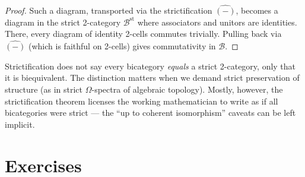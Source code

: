 \begin{proof}
Such a diagram, transported via the strictification $\widehat{(-)}$, becomes
a diagram in the strict 2-category $\mathcal{B}^{\mathrm{st}}$ where
associators and unitors are identities. There, every diagram of identity
2-cells commutes trivially. Pulling back via $\widehat{(-)}$ (which is faithful
on 2-cells) gives commutativity in $\mathcal{B}$.
\end{proof}

\begin{remark}
Strictification does not say every bicategory \emph{equals} a strict
2-category, only that it is biequivalent. The distinction matters when we
demand strict preservation of structure (as in strict $\Omega$-spectra of
algebraic topology). Mostly, however, the strictification theorem licenses
the working mathematician to write as if all bicategories were strict — the
``up to coherent isomorphism'' caveats can be left implicit.
\end{remark}


\section{Exercises}
\label{sec:bicat-exercises}

